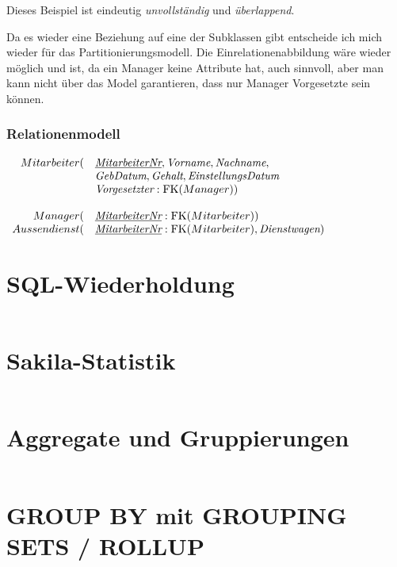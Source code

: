 \documentclass[12pt]{scrartcl}
\newcommand{\var}{\textit}
\newcommand{\PK}[1]{\underline{\var{#1}}}
\newcommand{\FK}[1]{\textup{FK}(#1)}
\newenvironment{relationalmodel}
  {\par\medskip
   \setlength{\arraycolsep}{0pt}%
   $\begin{array}{ r l }}
   {\end{array}$
   \par\medskip}
\begin{document}
Dieses Beispiel ist eindeutig \emph{unvollständig} und \emph{überlappend}.\par

Da es wieder eine Beziehung auf eine der Subklassen gibt entscheide ich mich wieder für das Partitionierungsmodell.
Die Einrelationenabbildung wäre wieder möglich und ist, da ein Manager keine Attribute hat, auch sinnvoll, aber man kann nicht über das Model garantieren, dass nur Manager Vorgesetzte sein können.\par

\subsubsection{Relationenmodell}

\begin{relationalmodel}
	Mitarbeiter( &
	\PK{MitarbeiterNr}, \var{Vorname}, \var{Nachname}, \\
	& \var{GebDatum}, \var{Gehalt}, \var{EinstellungsDatum} \\
	& \var{Vorgesetzter} : \FK{Manager}) \\ \\
	Manager( &
	\PK{MitarbeiterNr} : \FK{Mitarbeiter}) \\
	Aussendienst( &
	\PK{MitarbeiterNr} : \FK{Mitarbeiter}, \var{Dienstwagen}) \\
\end{relationalmodel}
\pagebreak

\section{SQL-Wiederholdung}
\inputminted{sql}{../ue2_2.sql}
\pagebreak

\section{Sakila-Statistik}
\inputminted{sql}{../ue2_3.sql}
\pagebreak

\section{Aggregate und Gruppierungen}
\inputminted{sql}{../ue2_4.sql}
\pagebreak

\section{GROUP BY mit GROUPING SETS / ROLLUP}
\inputminted{sql}{../ue2_5.sql}
\end{document}
